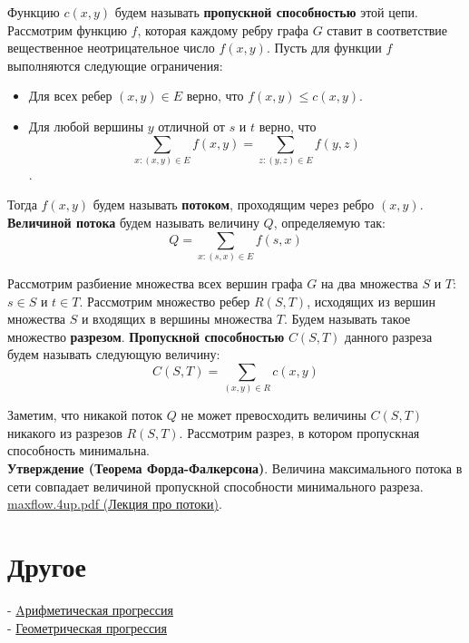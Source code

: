 \documentclass{article}
\begin{document}
Функцию $c(x, y)$ будем называть \textbf{пропускной способностью} этой цепи. \\

Рассмотрим функцию $f$, которая каждому ребру графа $G$ ставит в соответствие вещественное неотрицательное число $f(x, y)$. Пусть для функции $f$ выполняются следующие ограничения:

\begin{itemize}
	\item Для всех ребер $(x, y) \in E$ верно, что $f(x, y) \le c(x, y)$.
	\item Для любой вершины $y$ отличной от $s$ и $t$ верно, что $$\sum_{x : (x, y) \in E} f(x, y) = \sum_{z : (y, z) \in E} f(y, z)$$.
\end{itemize}  

Тогда $f(x, y)$ будем называть \textbf{потоком}, проходящим через ребро $(x, y)$. \textbf{Величиной потока} будем называть величину $Q$, определяемую так: $$Q = \sum_{x: (s, x) \in E} f(s, x) $$

Рассмотрим разбиение множества всех вершин графа $G$ на два множества $S$ и $T$: $s \in S$ и $t \in T$. Рассмотрим множество ребер $R(S, T)$, исходящих из вершин множества $S$ и входящих в вершины множества $T$. Будем называть такое множество \textbf{разрезом}. \textbf{Пропускной способностью} $C(S, T)$ данного разреза будем называть следующую величину: $$ C(S, T) = \sum_{(x, y) \in R} c(x, y) $$

Заметим, что никакой поток $Q$ не может превосходить величины $C(S, T)$ никакого из разрезов $R(S, T)$. Рассмотрим разрез, в котором пропускная способность минимальна. \\

\textbf{Утверждение (Теорема Форда-Фалкерсона)}. Величина максимального потока в сети совпадает величиной пропускной способности минимального разреза. \\

\href{https://www.cs.princeton.edu/courses/archive/spr04/cos226/lectures/maxflow.4up.pdf}{maxflow.4up.pdf (Лекция про потоки)}.

\section{Другое}

- \href{https://ru.wikipedia.org/wiki/%D0%90%D1%80%D0%B8%D1%84%D0%BC%D0%B5%D1%82%D0%B8%D1%87%D0%B5%D1%81%D0%BA%D0%B0%D1%8F_%D0%BF%D1%80%D0%BE%D0%B3%D1%80%D0%B5%D1%81%D1%81%D0%B8%D1%8F}{Aрифметическая прогрессия} \\
- \href{https://ru.wikipedia.org/wiki/%D0%93%D0%B5%D0%BE%D0%BC%D0%B5%D1%82%D1%80%D0%B8%D1%87%D0%B5%D1%81%D0%BA%D0%B0%D1%8F_%D0%BF%D1%80%D0%BE%D0%B3%D1%80%D0%B5%D1%81%D1%81%D0%B8%D1%8F}{Геометрическая прогрессия} \\
\end{document}
